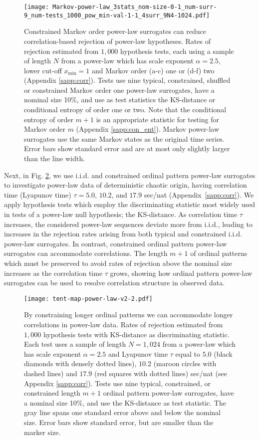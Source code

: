 \documentclass[%
prx,
reprint,
superscriptaddress,
nofootinbib,
 amsmath,amssymb,
 aps,
floatfix,
]{revtex4-2}
\begin{document}
\begin{figure}[htbp]
\texttt{[image: Markov-power-law\_3stats\_nom-size-0-1\_num-surr-9\_num-tests\_1000\_pow\_min-val-1-1\_4surr\_9N4-1024.pdf]}
\caption{
Constrained Markov order power-law surrogates can reduce correlation-based rejection of power-law hypotheses. Rates of rejection estimated from $1,000$ hypothesis tests, each using a sample of length $N$ from a power-law which has scale exponent $\alpha = 2.5$, lower cut-off $x_{\min} = 1$ and Markov order (a-c) one or (d-f) two (Appendix \ref{sapp:corr}). Tests use nine typical, constrained, shuffled or constrained Markov order one power-law surrogates, have a nominal size 10\%, and use as test statistics the KS-distance or conditional entropy of order one or two. Note that the conditional entropy of order $m + 1$ is an appropriate statistic for testing for Markov order $m$ (Appendix \ref{sapp:con_ent}). Markov power-law surrogates use the same Markov states as the original time series. Error bars show standard error and are at most only slightly larger than the line width.
}
\label{fig:power_corr}
\end{figure}

Next, in Fig. \ref{fig:hyp_test_tent_map}, we use i.i.d. and constrained ordinal pattern power-law surrogates to investigate power-law data of deterministic chaotic origin, having correlation time (Lyapunov time) $\tau = 5.0$, $10.2$, and $17.9$ sec/nat (Appendix~\ref{sapp:corr}). We apply hypothesis tests which employ the discriminating statistic most widely used in tests of a power-law null hypothesis; the KS-distance. As correlation time $\tau$ increases, the considered power-law sequences deviate more from i.i.d., leading to increases in the rejection rates arising from both typical and constrained i.i.d. power-law surrogates. In contrast, constrained ordinal pattern power-law surrogates can accommodate correlations. The length $m + 1$ of ordinal patterns which must be preserved to avoid rates of rejection above the nominal size increases as the correlation time $\tau$ grows, 
showing how ordinal pattern power-law surrogates can be used to resolve correlation structure in observed data. 

\begin{figure}[p]%
\centering
\texttt{[image: tent-map-power-law-v2-2.pdf]}
\caption{By constraining longer ordinal patterns we can accommodate longer correlations in power-law data. Rates of rejection estimated from $1,000$ hypothesis tests with KS-distance as discriminating statistic. Each test uses a sample of length $N = 1,024$ from a power-law which has scale exponent $\alpha = 2.5$ and Lyapunov time $\tau$ equal to $5.0$ (black diamonds with densely dotted lines), $10.2$ (maroon circles with dashed lines) and $17.9$ (red squares with dotted lines) sec/nat (see Appendix \ref{sapp:corr}). Tests use nine typical, constrained, or constrained length $m+1$ ordinal pattern power-law surrogates, have a nominal size 10\%, and use the KS-distance as test statistic. The gray line spans one standard error above and below the nominal size. Error bars show standard error, but are smaller than the marker size.
}
\label{fig:hyp_test_tent_map}
\end{figure}
\end{document}
